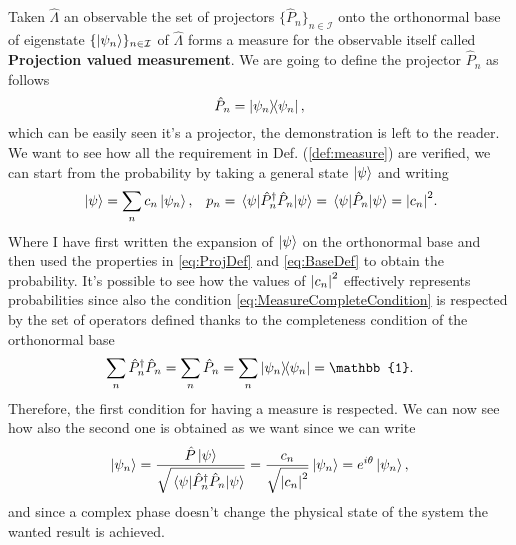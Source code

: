 {
    Taken $\hat{\Lambda}$ an observable the set of projectors $\{ \hat{P}_n \}_{n\in\mathcal{I}}$ onto the orthonormal base of eigenstate $\{\ket{\psi_n}\}_{n\in\mathcal{I}}$ of $\hat{\Lambda}$ forms a measure for the observable itself called \textbf{Projection valued measurement}.
}
{
    We are going to define the projector $\hat{P}_n$ as follows
    \begin{equation}
        \hat{P}_n = \ketbra{\psi_n},
    \end{equation}
    which can be easily seen it's a projector, the demonstration is left to the reader. We want to see how all the requirement in Def. (\ref{def:measure}) are verified, we can start from the probability by taking a general state $\ket{\psi}$ and writing
    \begin{align}
        &\ket{\psi} = \sum_n c_n\ket{\psi_n},   & p_n = \ev{\hat{P}^\dagger_n\hat{P}_n}{\psi} = \ev{\hat{P}_n}{\psi} = \abs{c_n}^2.
    \end{align}
    Where I have first written the expansion of $\ket{\psi}$ on the orthonormal base and then used the properties in \eqref{eq:ProjDef} and \eqref{eq:BaseDef} to obtain the probability. It's possible to see how the values of $\abs{c_n}^2$ effectively represents probabilities since also the condition \eqref{eq:MeasureCompleteCondition} is respected by the set of operators defined thanks to the completeness condition of the orthonormal base
    \begin{equation}
        \sum_n \hat{P}^\dagger_n\hat{P}_n = \sum_n \hat{P}_n = \sum_n \ketbra{\psi_n} = \mathbb{1}.
    \end{equation}
    Therefore, the first condition for having a measure is respected. We can now see how also the second one is obtained as we want since we can write
    \begin{equation}
        \ket{\psi_n} = \frac{\hat{P}\ket{\psi}}{\sqrt{\ev{\hat{P}^\dagger_n\hat{P}_n}{\psi}}} = \frac{c_n}{\sqrt{\abs{c_n}^2}}\ket{\psi_n} = e^{i\theta}\ket{\psi_n},
    \end{equation}
    and since a complex phase doesn't change the physical state of the system the wanted result is achieved.
}

